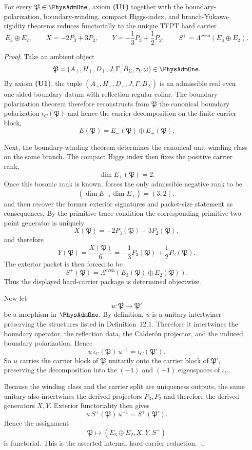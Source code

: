\begin{theorem}
\label{prop:universal-carrier-reduction}
For every $\mathfrak P\in\PhysAdmOne$, axiom \textbf{(U1)} together with the boundary-polarization,
boundary-winding, compact Higgs-index, and branch-Yukawa-rigidity theorems reduces functorially to
the unique TFPT hard carrier
\[
E_3\oplus E_2,
\qquad
X=-2P_3+3P_2,
\qquad
Y=-\frac13P_3+\frac12P_2,
\qquad
S^+=\Lambda^{\mathrm{even}}(E_3\oplus E_2).
\]
\end{theorem}

\begin{proof}
Take an ambient object
\[
\mathfrak P=(A_+,H_+,D_+,J,\Gamma,B_\Sigma,\tau_t,\omega)\in\PhysAdmOne.
\]
By axiom \textbf{(U1)}, the tuple $(A_+,H_+,D_+,J,\Gamma,B_\Sigma)$ is an admissible real even
one-sided boundary datum with reflection-regular collar. The boundary-polarization theorem
therefore reconstructs from $\mathfrak P$ the canonical boundary polarization $\iota_C(\mathfrak
P)$ and hence the carrier decomposition on the finite carrier block,
\[
E(\mathfrak P)=E_-(\mathfrak P)\oplus E_+(\mathfrak P).
\]

Next, the boundary-winding theorem determines the canonical unit winding class on the same branch.
The compact Higgs index then fixes the positive carrier rank,
\[
\dim E_+(\mathfrak P)=2.
\]
Once this bosonic rank is known,  forces the only admissible negative
rank to be
\[
(\dim E_-,\dim E_+)=(3,2),
\]
and  then recover the former exterior
signatures and packet-size statement as consequences. By the primitive trace condition the
corresponding primitive two-point generator is uniquely
\[
X(\mathfrak P)=-2P_3(\mathfrak P)+3P_2(\mathfrak P),
\]
and therefore
\[
Y(\mathfrak P)=\frac{X(\mathfrak P)}6=-\frac13P_3(\mathfrak P)+\frac12P_2(\mathfrak P).
\]
The exterior packet is then forced to be
\[
S^+(\mathfrak P)=\Lambda^{\mathrm{even}}(E_3(\mathfrak P)\oplus E_2(\mathfrak P)).
\]
Thus the displayed hard-carrier package is determined objectwise.

Now let
\[
u:\mathfrak P\to \mathfrak P'
\]
be a morphism in $\PhysAdmOne$. By definition, $u$ is a unitary intertwiner preserving the
structures listed in Definition~12.1. Therefore it intertwines the boundary operator, the
reflection data, the Calder\'on projector, and the induced boundary polarization. Hence
\[
u\,\iota_C(\mathfrak P)\,u^{-1}=\iota_C(\mathfrak P').
\]
So $u$ carries the carrier block of $\mathfrak P$ unitarily onto the carrier block of $\mathfrak
P'$, preserving the decomposition into the $(-1)$ and $(+1)$ eigenspaces of $\iota_C$.

Because the winding class and the carrier split are uniqueness outputs, the same unitary also
intertwines the derived projectors $P_3,P_2$ and therefore the derived generators $X,Y$. Exterior
functoriality then gives
\[
u\,S^+(\mathfrak P)\,u^{-1}=S^+(\mathfrak P').
\]
Hence the assignment
\[
\mathfrak P\longmapsto (E_3\oplus E_2,X,Y,S^+)
\]
is functorial. This is the asserted internal hard-carrier reduction.
\end{proof}

